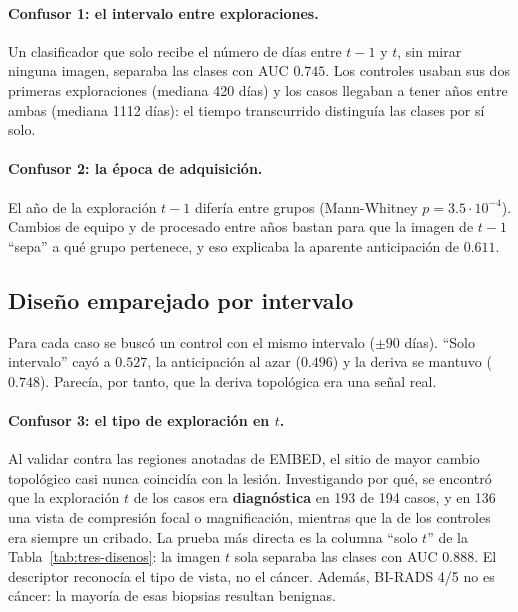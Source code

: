 \paragraph{Confusor 1: el intervalo entre exploraciones.} Un clasificador
que solo recibe el número de días entre $t-1$ y $t$, sin mirar ninguna
imagen, separaba las clases con AUC $0.745$. Los controles usaban sus dos
primeras exploraciones (mediana 420 días) y los casos llegaban a tener años
entre ambas (mediana 1112 días): el tiempo transcurrido distinguía las
clases por sí solo.

\paragraph{Confusor 2: la época de adquisición.} El año de la exploración
$t-1$ difería entre grupos (Mann-Whitney $p = 3.5\cdot10^{-4}$). Cambios de
equipo y de procesado entre años bastan para que la imagen de $t-1$ ``sepa''
a qué grupo pertenece, y eso explicaba la aparente anticipación de $0.611$.

\subsection{Diseño emparejado por intervalo}
Para cada caso se buscó un control con el mismo intervalo ($\pm 90$ días).
``Solo intervalo'' cayó a $0.527$, la anticipación al azar ($0.496$) y la
deriva se mantuvo ($0.748$). Parecía, por tanto, que la deriva topológica
era una señal real.

\paragraph{Confusor 3: el tipo de exploración en $t$.} Al validar contra
las regiones anotadas de EMBED, el sitio de mayor cambio topológico casi
nunca coincidía con la lesión. Investigando por qué, se encontró que la
exploración $t$ de los casos era \textbf{diagnóstica} en 193 de 194 casos, y
en 136 una vista de compresión focal o magnificación, mientras que la de los
controles era siempre un cribado. La prueba más directa es la columna
``solo $t$'' de la Tabla~\ref{tab:tres-disenos}: la imagen $t$ sola
separaba las clases con AUC $0.888$. El descriptor reconocía el tipo de
vista, no el cáncer. Además, BI-RADS 4/5 no es cáncer: la mayoría de esas
biopsias resultan benignas.

